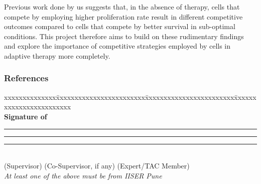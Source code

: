 \documentclass[12pt]{article}
\begin{document}
     Previous work done by us suggests that, in the absence of therapy, cells that compete by employing higher proliferation rate result in different competitive outcomes compared to cells that compete by better survival in sub-optimal conditions. This project therefore aims to build on these rudimentary findings and explore the importance of competitive strategies employed by cells in adaptive therapy more completely.


\subsubsection*{References}
\printbibliography[heading=none]

\begin{tabbing}
xxxxxxxxxxxxxx\=xxxxxxxxxxxxxxxxxxxxxxxx\=xxxxxxxxxxxxxxxxxxxxxxxx\=xxxxxxxxxxxxxxxxxxxxxxxx\kill
\\
{\bfseries Signature of}  \> \rule{4cm}{1pt} \> \rule{4.3cm}{1pt}\>\rule{4.3cm}{1pt} \\
\> {\small (Supervisor)} \>	{\small (Co-Supervisor, if any)} \> {\small (Expert/TAC Member)} \\
\> \emph{At least one of the above must be from IISER Pune}
\end{tabbing}
\end{document}
